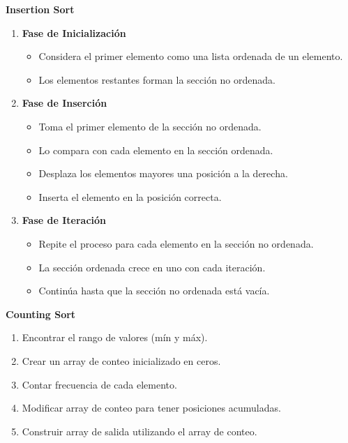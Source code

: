 \textbf{
Insertion Sort
}
\begin{enumerate}
    \item \textbf{Fase de Inicialización}
    \begin{itemize}
        \item Considera el primer elemento como una lista ordenada de un elemento.
        \item Los elementos restantes forman la sección no ordenada.
    \end{itemize}

    \item \textbf{Fase de Inserción}
    \begin{itemize}
        \item Toma el primer elemento de la sección no ordenada.
        \item Lo compara con cada elemento en la sección ordenada.
        \item Desplaza los elementos mayores una posición a la derecha.
        \item Inserta el elemento en la posición correcta.
    \end{itemize}

    \item \textbf{Fase de Iteración}
    \begin{itemize}
        \item Repite el proceso para cada elemento en la sección no ordenada.
        \item La sección ordenada crece en uno con cada iteración.
        \item Continúa hasta que la sección no ordenada está vacía.
    \end{itemize}
\end{enumerate}

\textbf{
Counting Sort
}
\begin{enumerate}
    \item Encontrar el rango de valores (mín y máx).
    \item Crear un array de conteo inicializado en ceros.
    \item Contar frecuencia de cada elemento.
    \item Modificar array de conteo para tener posiciones acumuladas.
    \item Construir array de salida utilizando el array de conteo.
\end{enumerate}



